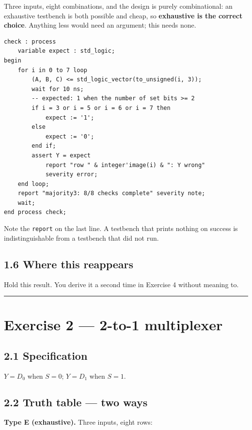 \documentclass[11pt]{article}
\newcommand{\code}[1]{\texttt{#1}}
\newcommand{\hr}{\vspace{2pt}\hrule\vspace{6pt}}
\begin{document}
Three inputs, eight combinations, and the design is purely combinational: an
exhaustive testbench is both possible and cheap, so \textbf{exhaustive is the
correct choice}. Anything less would need an argument; this needs none.

\begin{lstlisting}
check : process
    variable expect : std_logic;
begin
    for i in 0 to 7 loop
        (A, B, C) <= std_logic_vector(to_unsigned(i, 3));
        wait for 10 ns;
        -- expected: 1 when the number of set bits >= 2
        if i = 3 or i = 5 or i = 6 or i = 7 then
            expect := '1';
        else
            expect := '0';
        end if;
        assert Y = expect
            report "row " & integer'image(i) & ": Y wrong"
            severity error;
    end loop;
    report "majority3: 8/8 checks complete" severity note;
    wait;
end process check;
\end{lstlisting}

Note the \code{report} on the last line. A testbench that prints nothing on success
is indistinguishable from a testbench that did not run.

\subsection*{1.6 Where this reappears}

Hold this result. You derive it a second time in Exercise 4 without meaning to.

\vspace{4pt}\hr

\section*{Exercise 2 --- 2-to-1 multiplexer}

\subsection*{2.1 Specification}

$Y = D_0$ when $S = 0$; \quad $Y = D_1$ when $S = 1$.

\subsection*{2.2 Truth table --- two ways}

\textbf{Type E (exhaustive).} Three inputs, eight rows:
\end{document}

